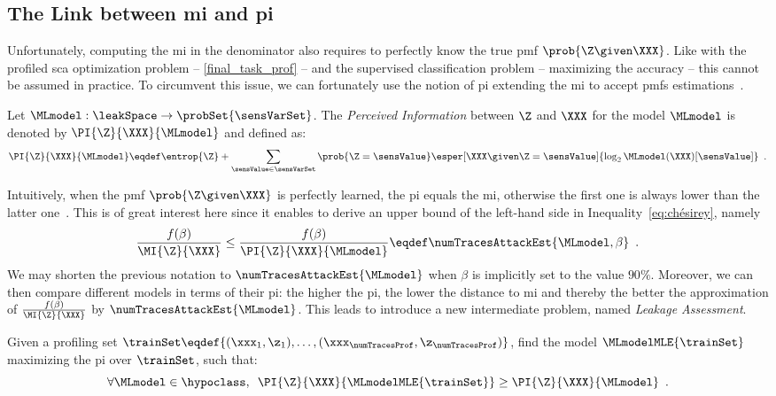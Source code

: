 \subsection{The Link between \gls{mi} and \gls{pi}}
\label{sec:link_mi_pi}
Unfortunately, computing the \gls{mi} in the denominator also requires to perfectly know the true \gls{pmf} \(\prob{\Z \given \XXX}\).
Like with the profiled \gls{sca} optimization problem -- \ie{} \autoref{final_task_prof} -- and the supervised classification problem -- \ie{} maximizing the accuracy -- this cannot be assumed in practice.
To circumvent this issue, we can fortunately use the notion of \gls{pi} extending the \gls{mi} to accept \glspl{pmf} estimations~\cite{renauld_formal_2011}.
\begin{definition}
    Let \(\MLmodel: \leakSpace \rightarrow \probSet{\sensVarSet}\).
    The \emph{Perceived Information} between \(\Z\) and \(\XXX\) for the model \(\MLmodel\) is denoted by \(\PI{\Z}{\XXX}{\MLmodel}\) and defined as:
    \begin{equation}
      \PI{\Z}{\XXX}{\MLmodel} \eqdef \entrop{\Z} +
      \sum_{\sensValue \in \sensVarSet} \prob{\Z = \sensValue}
      \esper[\XXX \given \Z = \sensValue]{\log_2 \MLmodel(\XXX)[\sensValue]} \enspace .
      \label{eq:PI}
    \end{equation}
\end{definition}
Intuitively, when the \gls{pmf} \(\prob{\Z \given \XXX}\) is perfectly learned, the \gls{pi} equals the \gls{mi}, otherwise the first one is always lower than the latter 
one~\cite{bronchain_leakage_2019}.
This is of great interest here since it enables to derive an upper bound of the left-hand side in Inequality~\eqref{eq:chésirey}, namely
\begin{equation}
	\frac{f(\beta)}{\MI{\Z}{\XXX}} \leq \frac{f(\beta)}{\PI{\Z}{\XXX}{\MLmodel}} \eqdef \numTracesAttackEst{\MLmodel, \beta} \enspace .
\end{equation}
We may shorten the previous notation to \(\numTracesAttackEst{\MLmodel}\) when \(\beta\) is implicitly set to the value \(90\%\).
Moreover, we can then compare different models in terms of their \gls{pi}: the higher the \gls{pi}, the lower the distance to \gls{mi} and thereby the better the approximation of \(\frac{f(\beta)}{\MI{\Z}{\XXX}}\) by \(\numTracesAttackEst{\MLmodel}\).
This leads to introduce a new intermediate problem, named \emph{Leakage Assessment}.
\begin{problem}
    \label{leak_assess}
    Given a profiling set \(\trainSet \eqdef \{(\xxx_1, \z_1), \ldots, (\xxx_{\numTracesProf},\z_{\numTracesProf})\}\), find the model \(\MLmodelMLE{\trainSet}\) maximizing the \gls{pi} over \(\trainSet\), \ie{} such that:
    \begin{equation}
        \forall \MLmodel \in \hypoclass, \enspace \PI{\Z}{\XXX}{\MLmodelMLE{\trainSet}} \geq \PI{\Z}{\XXX}{\MLmodel} \enspace .
    \end{equation}
\end{problem}

